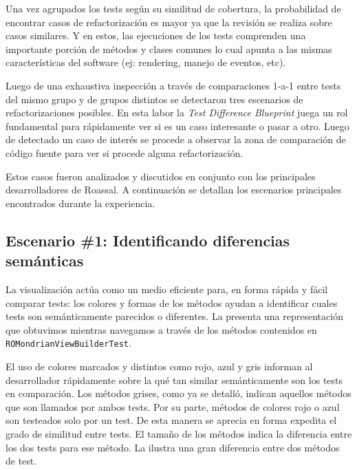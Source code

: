 \par Una vez agrupados los tests según su similitud de cobertura, la probabilidad de encontrar casos de refactorización es mayor ya que la revisión se realiza sobre casos similares. Y en estos, las ejecuciones de los tests comprenden una importante porción de métodos y clases comunes lo cual apunta a las mismas características del software (ej: rendering, manejo de eventos, etc). 

\par Luego de una exhaustiva inspección a través de comparaciones 1-a-1 entre tests del mismo grupo y de grupos distintos se detectaron tres escenarios de refactorizaciones posibles. En esta labor la \emph{Test Difference Blueprint} juega un rol fundamental para rápidamente ver si es un caso interesante o pasar a otro. Luego de detectado un caso de interés se procede  a observar la zona de comparación de código fuente para ver si procede alguna refactorización.

\par Estos casos fueron analizados y discutidos en conjunto con los principales desarrolladores de Roassal. A continuación se detallan los escenarios principales encontrados durante la experiencia.

\newpage
\subsection{Escenario \#1: Identificando diferencias semánticas}

\par La visualización actúa como un medio eficiente para, en forma rápida y fácil comparar tests: los colores y formas de los métodos ayudan a identificar cuales tests son semánticamente parecidos o diferentes.
La  presenta una representación que obtuvimos mientras navegamos a través de los métodos contenidos en {\tt ROMondrianViewBuilderTest}. 

\par El uso de colores marcados y distintos como rojo, azul y gris informan al desarrollador rápidamente sobre la qué tan similar semánticamente son los tests en comparación. Los métodos grises, como ya se detalló, indican aquellos métodos que son llamados por ambos tests. Por su parte, métodos de colores rojo o azul son testeados solo por un test. De esta manera se aprecia en forma expedita el grado de similitud entre tests. El tamaño de los métodos indica la diferencia entre los dos tests para ese método. La  ilustra una gran diferencia entre dos métodos de test.

